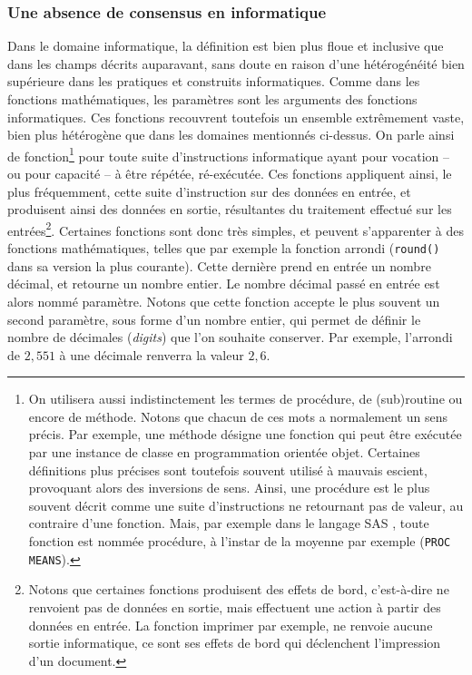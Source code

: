 \subsubsection{Une absence de consensus en informatique}
Dans le domaine informatique, la définition est bien plus floue et inclusive que dans les champs décrits auparavant, sans doute en raison d'une hétérogénéité bien supérieure dans les pratiques et construits informatiques. Comme dans les fonctions mathématiques, les paramètres sont les arguments des fonctions informatiques. Ces fonctions recouvrent toutefois un ensemble extrêmement vaste, bien plus hétérogène que dans les domaines mentionnés ci-dessus.
On parle ainsi de fonction\footnote{On utilisera aussi indistinctement les termes de procédure, de (sub)routine ou encore de méthode. Notons que chacun de ces mots a normalement un sens précis. Par exemple, une méthode désigne une fonction qui peut être exécutée par une instance de classe en programmation orientée objet. Certaines définitions plus précises sont toutefois souvent utilisé à mauvais escient, provoquant alors des inversions de sens. Ainsi, une procédure est le plus souvent décrit comme une suite d'instructions ne retournant pas de valeur, au contraire d'une fonction. Mais, par exemple dans le langage SAS \autocite{sas1990sas}, toute fonction est nommée procédure, à l'instar de la moyenne par exemple (\texttt{PROC MEANS}).} pour toute suite d'instructions informatique ayant pour vocation -- ou pour capacité -- à être répétée, ré-exécutée.
Ces fonctions appliquent ainsi, le plus fréquemment, cette suite d'instruction sur des données en entrée, et produisent ainsi des données en sortie, résultantes du traitement effectué sur les entrées\footnote{
	Notons que certaines fonctions produisent des \og effets de bord\fg{}, c'est-à-dire ne renvoient pas de données en sortie, mais effectuent une action à partir des données en entrée. La fonction imprimer par exemple, ne renvoie aucune sortie informatique, ce sont ses effets de bord qui déclenchent l'impression d'un document.
}.
Certaines fonctions sont donc très simples, et peuvent s'apparenter à des fonctions mathématiques, telles que par exemple la fonction arrondi (\texttt{round()} dans sa version la plus courante). Cette dernière prend en entrée un nombre décimal, et retourne un nombre entier. Le nombre décimal passé en entrée est alors nommé paramètre. Notons que cette fonction accepte le plus souvent un second paramètre, sous forme d'un nombre entier, qui permet de définir le nombre de décimales (\textit{digits}) que l'on souhaite conserver. Par exemple, l'arrondi de $2,551$ à une décimale renverra la valeur $2,6$.
